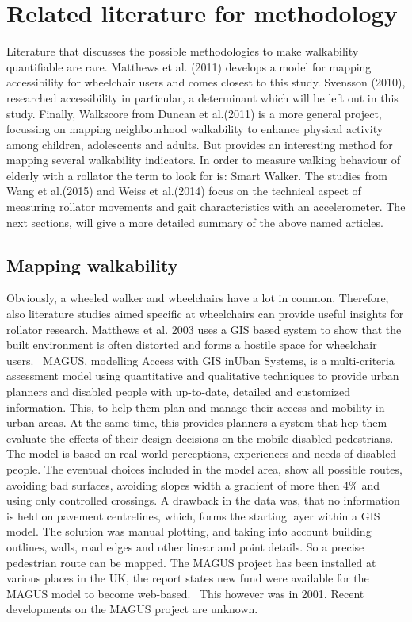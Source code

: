 \section{Related literature for methodology}\label{literature}
Literature that discusses the possible methodologies to make walkability quantifiable are rare. Matthews et al. (2011) develops a model for mapping accessibility for wheelchair users and comes closest to this study. Svensson (2010), researched accessibility in particular, a determinant which will be left out in this study. Finally, Walkscore from Duncan et al.(2011) is a more general project, focussing on mapping neighbourhood walkability to enhance physical activity among children, adolescents and adults. But provides an interesting method for mapping several walkability indicators. In order to measure walking behaviour of elderly with a rollator the term to look for is: Smart Walker. The studies from Wang et al.(2015) and Weiss et al.(2014) focus on the technical aspect of measuring rollator movements and gait characteristics with an accelerometer. The next sections, will give a more detailed summary of the above named articles. 

\subsection{Mapping walkability}
Obviously, a wheeled walker and wheelchairs have a lot in common. Therefore, also literature studies aimed specific at wheelchairs can provide useful insights for rollator research. Matthews et al. 2003 uses a GIS based system to show that the built environment is often distorted and forms a hostile space for wheelchair users.~\cite{Matthews2003} MAGUS, modelling Access with GIS inUban Systems, is a multi-criteria assessment model using quantitative and qualitative techniques to provide urban planners and disabled people with up-to-date, detailed and customized information. This, to help them plan and manage their access and mobility in urban areas. At the same time, this provides planners a system that hep them evaluate the effects of their design decisions on the mobile disabled pedestrians.~\cite{Matthews2003} The model is based on real-world perceptions, experiences and needs of disabled people. The eventual choices included in the model area, show all possible routes, avoiding bad surfaces, avoiding slopes width a gradient of more then 4\% and using only controlled crossings. A drawback in the data was, that no information is held on pavement centrelines, which, forms the starting layer within a GIS model. The solution was manual plotting, and taking into account building outlines, walls, road edges and other linear and point details. So a precise pedestrian route can be mapped. The MAGUS project has been installed at various places in the UK, the report states new fund were available for the MAGUS model to become web-based.~\cite{Matthews2003} This however was in 2001. Recent developments on the MAGUS project are unknown. 

